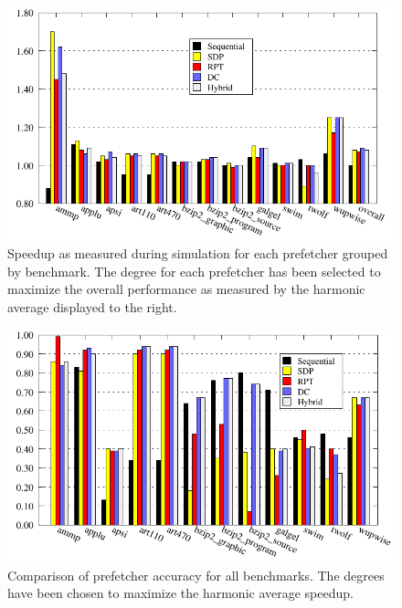 \begin{figure}
  \centering
  \includegraphics{plots/overview_speedup.pdf}
  \caption{
    Speedup as measured during simulation for each prefetcher grouped by
    benchmark.
    The degree for each prefetcher has been selected to maximize the overall
    performance as measured by the harmonic average displayed to the right.
  }
  \label{fig:comparison}
\end{figure}

\begin{figure}
  \centering
  \includegraphics{plots/accuracy_overview.pdf}
  \caption{
      Comparison of prefetcher accuracy for all benchmarks.
      The degrees have been chosen to maximize the harmonic average speedup.
  }
  \label{fig:accuracy}
\end{figure}

